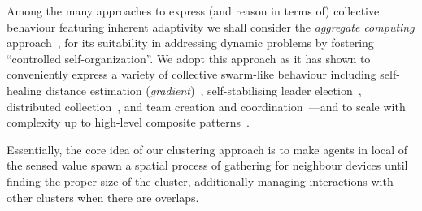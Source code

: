 Among the many approaches to express (and reason in terms of) collective behaviour featuring inherent adaptivity we shall consider the \emph{aggregate computing} approach~\cite{DBLP:journals/jlap/ViroliBDACP19},
 for its suitability in addressing dynamic problems by fostering ``controlled self-organization''.
%
%
%
%
%
We adopt this approach as it has shown to conveniently express
 a variety of  collective swarm-like behaviour including
 self-healing distance estimation (\emph{gradient})~\cite{DBLP:conf/saso/AudritoCDV17},
 self-stabilising leader election~\cite{DBLP:conf/saso/MoBD18},
 distributed collection~\cite{audrito2021jcee-distributed-collection},
 and team creation and coordination~\cite{DBLP:journals/eaai/CasadeiVAPD21}---and to scale with complexity up to high-level composite patterns~\cite{DBLP:journals/fgcs/PianiniCVN21}.

Essentially, the core idea of our clustering approach is to make agents
 in local  of the sensed value  spawn a spatial process of gathering for neighbour devices until finding the proper size of the cluster,
 additionally managing interactions with other clusters when there are overlaps.
%
%

